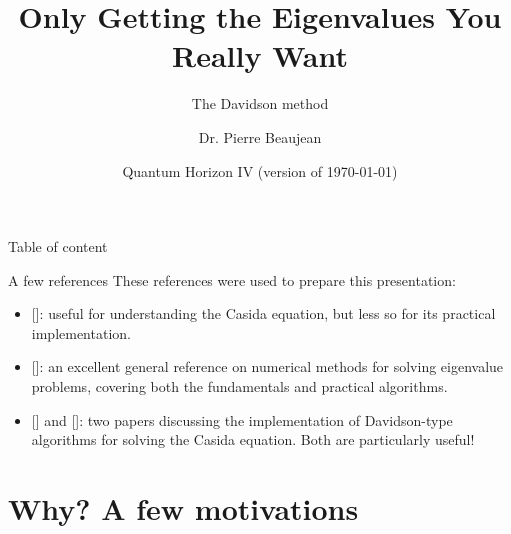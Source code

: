 \documentclass[10pt,aspectratio=169]{beamer}
\begin{document}
\author{Dr. Pierre Beaujean}
\title{Only Getting the Eigenvalues You Really Want}
\subtitle{The Davidson method}
\date{Quantum Horizon IV (version of \today)}

\begin{frame}[plain]
\maketitle
\end{frame}

\begin{frame}{Table of content}
	\tableofcontents
\end{frame}

\begin{frame}{A few references}
	These references were used to prepare this presentation:
	\begin{itemize}
		\item {} []: useful for understanding the Casida equation, but less so for its practical implementation.
		\item {} []: an excellent general reference on numerical methods for solving eigenvalue problems, covering both the fundamentals and practical algorithms.
		\item {} [] and []: two papers discussing the implementation of Davidson-type algorithms for solving the Casida equation. Both are particularly useful!
	\end{itemize}
\end{frame}

\section{Why? A few motivations}
\end{document}
